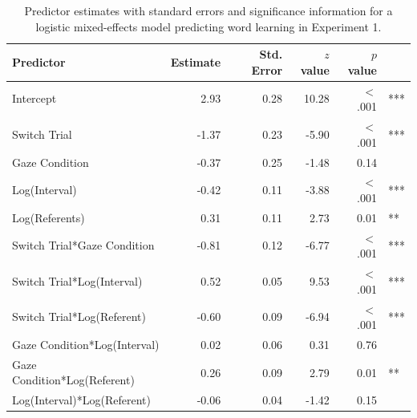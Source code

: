 \documentclass[authoryear, review]{elsarticle}
\begin{document}
\begin{table}[tb]
\centering
\begin{tabular}{lrrrrl}
 Predictor & Estimate & Std. Error & $z$ value & $p$ value &  \\ 
  \hline
Intercept & 2.93 & 0.28 & 10.28 & $<$ .001 & *** \\ 
  Switch Trial & -1.37 & 0.23 & -5.90 & $<$ .001 & *** \\ 
  Gaze Condition & -0.37 & 0.25 & -1.48 & 0.14 &  \\ 
  Log(Interval) & -0.42 & 0.11 & -3.88 & $<$ .001 & *** \\ 
  Log(Referents) & 0.31 & 0.11 & 2.73 & 0.01 & ** \\ 
  Switch Trial*Gaze Condition & -0.81 & 0.12 & -6.77 & $<$ .001 & *** \\ 
  Switch Trial*Log(Interval) & 0.52 & 0.05 & 9.53 & $<$ .001 & *** \\ 
  Switch Trial*Log(Referent) & -0.60 & 0.09 & -6.94 & $<$ .001 & *** \\ 
  Gaze Condition*Log(Interval) & 0.02 & 0.06 & 0.31 & 0.76 &  \\ 
  Gaze Condition*Log(Referent) & 0.26 & 0.09 & 2.79 & 0.01 & ** \\ 
  Log(Interval)*Log(Referent) & -0.06 & 0.04 & -1.42 & 0.15 &  \\ 
   \hline
\end{tabular}
\caption{Predictor estimates with standard errors and significance information for a logistic mixed-effects model predicting word learning in Experiment 1.} 
\label{tab:exp1_reg}
\end{table}
\end{document}
